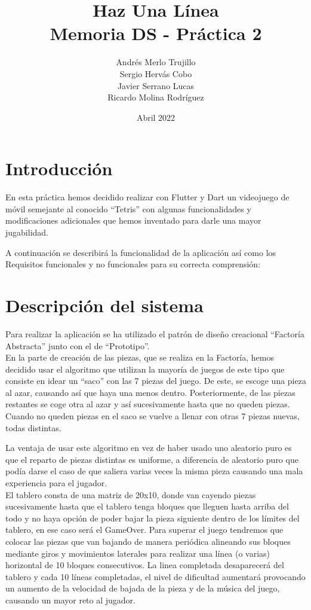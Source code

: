 \documentclass{article}
\title{Haz Una Línea\\
\large Memoria DS - Práctica 2}
\author{Andrés Merlo Trujillo\\ Sergio Hervás Cobo\\ Javier Serrano Lucas\\ Ricardo Molina Rodríguez}
\begin{document}
\date{Abril 2022}
\maketitle
\section{Introducción}
En esta práctica hemos decidido realizar con Flutter y Dart un videojuego de móvil
semejante al conocido ``Tetris'' con algunas funcionalidades y modificaciones adicionales
que hemos inventado para darle una mayor jugabilidad.

A continuación se describirá la funcionalidad de la aplicación así como los Requisitos
funcionales y no funcionales para su correcta comprensión:

\section{Descripción del sistema}
Para realizar la aplicación se ha utilizado el patrón de diseño creacional
 ``Factoría Abstracta'' junto con el de ``Prototipo''.\\

En la parte de creación de las piezas, que se realiza en la Factoría, hemos
 decidido usar el algoritmo que utilizan la mayoría de juegos de este tipo que
 consiste en idear un ``saco'' con las 7 piezas del juego. De este, se escoge una pieza al azar,
 causando así que haya una menos dentro. Posteriormente, de las piezas restantes se coge otra al azar
  y así sucesivamente hasta que no queden piezas. Cuando no queden piezas en el saco se vuelve
  a llenar con otras 7 piezas nuevas, todas distintas.

La ventaja de usar este algoritmo en vez de haber usado uno aleatorio puro es
 que el reparto de piezas distintas es uniforme, a diferencia de aleatorio puro
 que podía darse el caso de que saliera varias veces la misma pieza causando una
 mala experiencia para el jugador.\\


El tablero consta de una matriz de 20x10, donde van cayendo piezas sucesivamente
hasta que el tablero tenga bloques que lleguen hasta arriba del todo y no haya
opción de poder bajar la pieza siguiente dentro de los límites del tablero, en
ese caso será el GameOver. Para superar el juego tendremos que colocar
las piezas que van bajando de manera periódica alineando sus bloques mediante
giros y movimientos laterales para realizar una línea (o varias) horizontal de
10 bloques consecutivos. La linea completada desaparecerá del tablero y cada 10 líneas
completadas, el nivel de dificultad aumentará provocando un aumento de la velocidad de
bajada de la pieza y de la música del juego, causando un mayor reto al jugador.
\end{document}
